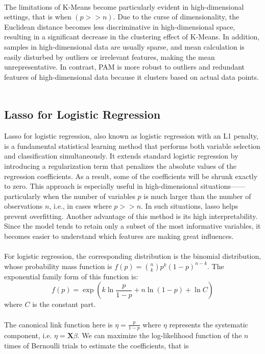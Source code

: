 \\
The limitations of K-Means become particularly evident in high-dimensional settings, that is when $(p>>n)$. Due to the curse of dimensionality, the Euclidean distance becomes less discriminative in high-dimensional space, resulting in a significant decrease in the clustering effect of K-Means. In addition, samples in high-dimensional data are usually sparse, and mean calculation is easily disturbed by outliers or irrelevant features, making the mean unrepresentative. In contrast, PAM is more robust to outliers and redundant features of high-dimensional data because it clusters based on actual data points.\\
\\
\subsection{Lasso for Logistic Regression}\label{subsec:LR}
Lasso for logistic regression, also known as logistic regression with an L1 penalty, is a fundamental statistical learning method that performs both variable selection and classification simultaneously. It extends standard logistic regression by introducing a regularization term that penalizes the absolute values of the regression coefficients. As a result, some of the coefficients will be shrunk exactly to zero. This approach is especially useful in high-dimensional situations——particularly when the number of variables $p$ is much larger than the number of observations $n$, i.e., in cases where $p>>n$. In such situations, lasso helps prevent overfitting. Another advantage of this method is its high interpretability. Since the model tends to retain only a subset of the most informative variables, it becomes easier to understand which features are making great influences.\\
\\
For logistic regression, the corresponding distribution is the binomial distribution, whose probability mass function is $f(p)=\binom{n}{k} p^k(1-p)^{n-k}$. The exponential family form of this function is:\\
\begin{equation}
f(p)=\exp(k\ln \frac{p}{1-p}+n\ln(1-p)+\ln C)
\label{binomial}
\end{equation} 
where $C$ is the constant part.\\
\\
The canonical link function here is $\eta=\frac{p}{1-p}$ where $\eta$ represents the systematic component, i.e. $\eta=\boldsymbol{X}\beta$. We can maximize the log-likelihood function of the $n$ times of Bernoulli trials to estimate the coefficients, that is\\ 
